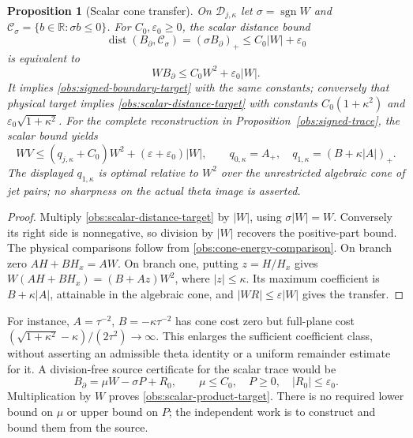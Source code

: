 \documentclass[11pt]{article}
\numberwithin{equation}{section}
\newtheorem{proposition}[theorem]{Proposition}
\theoremstyle{definition}
\theoremstyle{remark}
\newcommand{\R}{\mathbb R}
\begin{document}
\begin{proposition}[Scalar cone transfer]
\label{obs:scalar-cone-transfer}
On $\mathcal D_{j,\kappa}$ let $\sigma=\operatorname{sgn}W$ and
$\mathcal C_\sigma=\{b\in\R:\sigma b\le0\}$.
For $C_0,\varepsilon_0\ge0$, the scalar distance bound
\begin{equation}
 \operatorname{dist}(B_\partial,\mathcal C_\sigma)
 = (\sigma B_\partial)_+\le C_0|W|+\varepsilon_0
 \label{obs:scalar-distance-target}
\end{equation}
is equivalent to
\begin{equation}
 WB_\partial\le C_0W^2+\varepsilon_0|W|.
 \label{obs:scalar-product-target}
\end{equation}
It implies \eqref{obs:signed-boundary-target} with the same constants;
conversely that physical target implies
\eqref{obs:scalar-distance-target} with constants
$C_0(1+\kappa^2)$ and $\varepsilon_0\sqrt{1+\kappa^2}$.
For the complete reconstruction in Proposition~\ref{obs:signed-trace},
the scalar bound yields
\begin{equation}
 WV\le(q_{j,\kappa}+C_0)W^2
              +(\varepsilon+\varepsilon_0)|W|,
 \qquad q_{0,\kappa}=A_+,\quad
 q_{1,\kappa}=(B+\kappa|A|)_+.
 \label{obs:cone-reconstruction-transfer}
\end{equation}
The displayed $q_{1,\kappa}$ is optimal relative to $W^2$ over the
unrestricted algebraic cone of jet pairs; no sharpness on the actual
theta image is asserted.
\end{proposition}
\begin{proof}
Multiply \eqref{obs:scalar-distance-target} by $|W|$, using
$\sigma|W|=W$. Conversely its right side is nonnegative, so
division by $|W|$ recovers the positive-part bound.
The physical comparisons follow from
\eqref{obs:cone-energy-comparison}.
On branch zero $AH+BH_x=AW$. On branch one, putting $z=H/H_x$
gives $W(AH+BH_x)=(B+Az)W^2$, where $|z|\le\kappa$.
Its maximum coefficient is $B+\kappa|A|$, attainable in the
algebraic cone, and $|WR|\le\varepsilon|W|$ gives the transfer.
\end{proof}

For instance, $A=\tau^{-2}$, $B=-\kappa\tau^{-2}$ has cone cost
zero but full-plane cost
$(\sqrt{1+\kappa^2}-\kappa)/(2\tau^2)\to\infty$.
This enlarges the sufficient coefficient class, without asserting an
admissible theta identity or a uniform remainder estimate for it.
A division-free source certificate for the scalar trace would be
\begin{equation}
 B_\partial=\mu W-\sigma P+R_0,\qquad
 \mu\le C_0,\quad P\ge0,\quad |R_0|\le\varepsilon_0.
 \label{obs:scalar-source-certificate}
\end{equation}
Multiplication by $W$ proves \eqref{obs:scalar-product-target}.
There is no required lower bound on $\mu$ or upper bound on $P$;
the independent work is to construct and bound them from the source.
\end{document}
